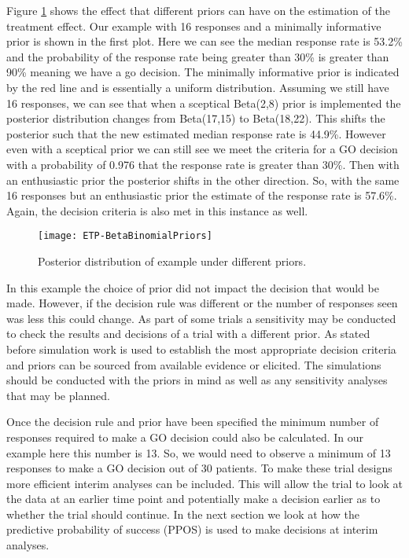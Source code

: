 Figure \ref{fig_etp:bb_example_priors} shows the effect that different priors can have on the estimation of the treatment effect. Our example with 16 responses and a minimally informative prior is shown in the first plot. Here we can see the median response rate is 53.2\% and the probability of the response rate being greater than 30\% is greater than 90\% meaning we have a go decision. The minimally informative prior is indicated by the red line and is essentially a uniform distribution. Assuming we still have 16 responses, we can see that when a sceptical Beta(2,8) prior is implemented the posterior distribution changes from Beta(17,15) to Beta(18,22). This shifts the posterior such that the new estimated median response rate is 44.9\%. However even with a sceptical prior we can still see we meet the criteria for a GO decision with a probability of 0.976 that the response rate is greater than 30\%. Then with an enthusiastic prior the posterior shifts in the other direction. So, with the same 16 responses but an enthusiastic prior the estimate of the response rate is 57.6\%. Again, the decision criteria is also met in this instance as well.    

 \begin{figure}[h!]
	\centering
	\caption{Posterior distribution of example under different priors.}
	\label{fig_etp:bb_example_priors}
	\texttt{[image: ETP-BetaBinomialPriors]}
\end{figure}

In this example the choice of prior did not impact the decision that would be made. However, if the decision rule was different or the number of responses seen was less this could change. As part of some trials a sensitivity may be conducted to check the results and decisions of a trial with a different prior. As stated before simulation work is used to establish the most appropriate decision criteria and priors can be sourced from available evidence or elicited. The simulations should be conducted with the priors in mind as well as any sensitivity analyses that may be planned.   

Once the decision rule and prior have been specified the minimum number of responses required to make a GO decision could also be calculated. In our example here this number is 13. So, we would need to observe a minimum of 13 responses to make a GO decision out of 30 patients. To make these trial designs more efficient interim analyses can be included. This will allow the trial to look at the data at an earlier time point and potentially make a decision earlier as to whether the trial should continue. In the next section we look at how the predictive probability of success (PPOS) is used to make decisions at interim analyses. 

